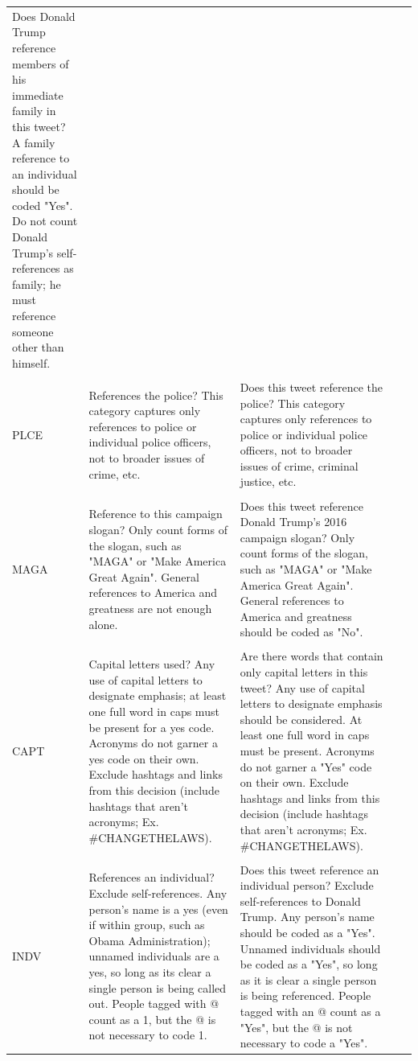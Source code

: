 \documentclass{article}
\begin{document}
\begin{longtable}{@{}lp{6cm}p{7cm}ll@{}}
  Does Donald Trump reference members of his immediate family in   this tweet?  A family reference to an   individual should be coded "Yes".    Do not count Donald Trump's self-references as family; he must   reference someone other than himself. &
   &
   \\ \\
PLCE &
  References the police?  This   category captures only references to police or individual police officers,   not to broader issues of crime, etc. &
  Does this tweet reference the police?  This category captures only references to   police or individual police officers, not to broader issues of crime,   criminal justice, etc. &
   &
   \\ \\
MAGA &
  Reference to this campaign slogan?  Only count forms of the slogan, such as   "MAGA" or "Make America Great Again".  General references to America and greatness   are not enough alone. &
  Does this tweet reference Donald Trump's 2016 campaign   slogan?  Only count forms of the   slogan, such as "MAGA" or "Make America Great   Again".  General references to   America and greatness should be coded as "No". &
   &
   \\ \\
CAPT &
  Capital letters used?  Any   use of capital letters to designate emphasis; at least one full word in caps   must be present for a yes code.    Acronyms do not garner a yes code on their own.  Exclude hashtags and links from this   decision (include hashtags that aren’t acronyms; Ex. \#CHANGETHELAWS). &
  Are there words that contain only capital letters in this   tweet?  Any use of capital letters to   designate emphasis should be considered. At least one full word in caps must   be present.  Acronyms do not garner a "Yes"   code on their own.  Exclude hashtags   and links from this decision (include hashtags that aren’t acronyms; Ex.   \#CHANGETHELAWS). &
   &
   \\ \\
INDV &
  References an individual?    Exclude self-references.  Any   person’s name is a yes (even if within group, such as Obama Administration);   unnamed individuals are a yes, so long as its clear a single person is being   called out.  People tagged with @ count   as a 1, but the @ is not necessary to code 1. &
  Does this tweet reference an individual person?  Exclude self-references to Donald   Trump.  Any person’s name should be   coded as a "Yes". Unnamed individuals should be coded as a   "Yes", so long as it is clear a single person is being   referenced.  People tagged with an @   count as a "Yes", but the @ is not necessary to code a   "Yes". &

\end{longtable}
\end{document}
